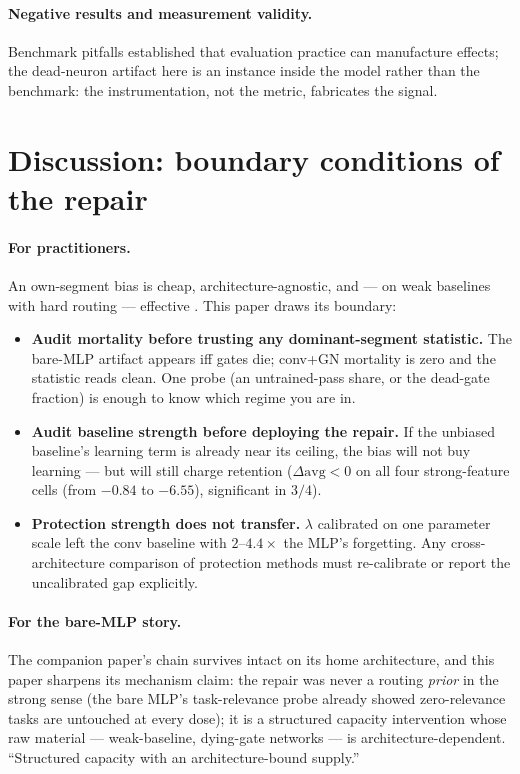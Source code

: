 \documentclass[review,12pt,number]{elsarticle}
\begin{document}
\paragraph{Negative results and measurement validity.} Benchmark pitfalls
\cite{musgrave2020,lucic2018,melis2018,agarwal2021,lipton2019} established
that evaluation practice can manufacture effects; the dead-neuron artifact
here is an instance inside the model rather than the benchmark: the
instrumentation, not the metric, fabricates the signal.



\section{Discussion: boundary conditions of the repair}
\label{sec:boundary}

\paragraph{For practitioners.} An own-segment bias is cheap,
architecture-agnostic, and --- on weak baselines with hard routing ---
effective . This paper draws its boundary:
\begin{itemize}
\item \textbf{Audit mortality before trusting any dominant-segment
statistic.} The bare-MLP artifact appears iff gates die; conv+GN mortality
is zero and the statistic reads clean. One probe (an untrained-pass
share, or the dead-gate fraction) is enough to know which regime you
are in.
\item \textbf{Audit baseline strength before deploying the repair.}
If the unbiased baseline's learning term is already near its ceiling,
the bias will not buy learning --- but will still charge retention
($\Delta\mathrm{avg}<0$ on all four strong-feature cells (from $-0.84$ to $-6.55$),
significant in $3/4$).
\item \textbf{Protection strength does not transfer.} $\lambda$
calibrated on one parameter scale left the conv baseline with
$2$--$4.4\times$ the MLP's forgetting. Any cross-architecture
comparison of protection methods must re-calibrate or report the
uncalibrated gap explicitly.
\end{itemize}

\paragraph{For the bare-MLP story.} The companion paper's chain survives
intact on its home architecture, and this paper sharpens its
mechanism claim: the repair was never a routing \emph{prior} in the
strong sense (the bare MLP's task-relevance probe already showed
zero-relevance tasks are untouched at every dose); it is a structured capacity
intervention whose raw material --- weak-baseline, dying-gate
networks --- is architecture-dependent. ``Structured capacity with an
architecture-bound supply.''
\end{document}
